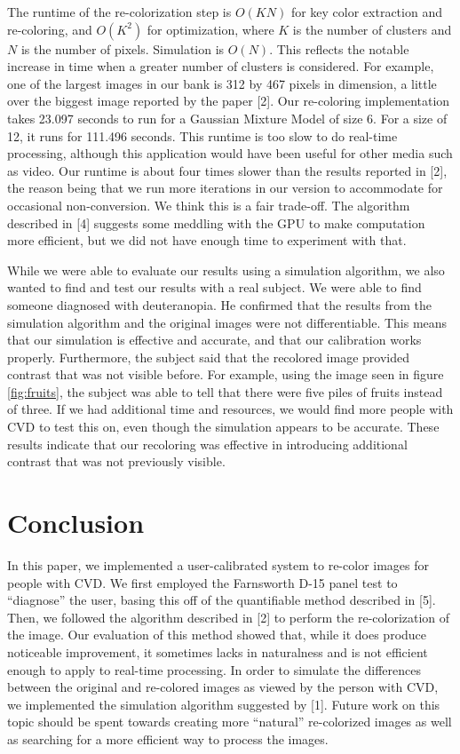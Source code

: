 \documentclass[10pt,twocolumn,letterpaper]{article}
\begin{document}
The runtime of the re-colorization step is $O(KN)$ for key color extraction and re-coloring, and $O(K^{2})$ for optimization, where $K$ is the number of clusters and $N$ is the number of pixels. Simulation is $O(N)$. This reflects the notable increase in time when a greater number of clusters is considered. For example, one of the largest images in our bank is 312 by 467 pixels in dimension, a little over the biggest image reported by the paper [2]. Our re-coloring implementation takes 23.097 seconds to run for a Gaussian Mixture Model of size 6. For a size of 12, it runs for 111.496 seconds. This runtime is too slow to do real-time processing, although this application would have been useful for other media such as video. Our runtime is about four times slower than the results reported in [2], the reason being that we run more iterations in our version to accommodate for occasional non-conversion.  We think this is a fair trade-off.  The algorithm described in [4] suggests some meddling with the GPU to make computation more efficient, but we did not have enough time to experiment with that. 

While we were able to evaluate our results using a simulation algorithm, we also wanted to find and test our results with a real subject. We were able to find someone diagnosed with deuteranopia. He confirmed that the results from the simulation algorithm and the original images were not differentiable. This means that our simulation is effective and accurate, and that our calibration works properly. Furthermore, the subject said that the recolored image provided contrast that was not visible before. For example, using the image seen in figure \ref{fig:fruits}, the subject was able to tell that there were five piles of fruits instead of three. If we had additional time and resources, we would find more people with CVD to test this on, even though the simulation appears to be accurate. These results indicate that our recoloring was effective in introducing additional contrast that was not previously visible. 

\section{Conclusion}

In this paper, we implemented a user-calibrated system to re-color images for people with CVD. We first employed the Farnsworth D-15 panel test to “diagnose” the user, basing this off of the quantifiable method described in [5]. Then, we followed the algorithm described in [2] to perform the re-colorization of the image. Our evaluation of this method showed that, while it does produce noticeable improvement, it sometimes lacks in naturalness and is not efficient enough to apply to real-time processing. In order to simulate the differences between the original and re-colored images as viewed by the person with CVD, we implemented the simulation algorithm suggested by [1]. Future work on this topic should be spent towards creating more “natural” re-colorized images as well as searching for a more efficient way to process the images.
\end{document}

